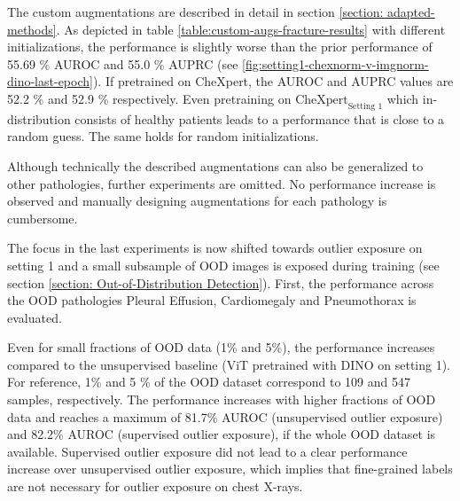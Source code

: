 The custom augmentations are described in detail in section \ref{section: adapted-methods}.
As depicted in table \ref{table:custom-augs-fracture-results} with different initializations, the performance is slightly worse than the prior performance of 55.69 \% AUROC  and 55.0 \% AUPRC (see \ref{fig:setting1-chexnorm-v-imgnorm-dino-last-epoch}).
If pretrained on CheXpert, the AUROC and AUPRC values are 52.2 \% and 52.9 \% respectively. 
Even pretraining on $\text{CheXpert}_\text{Setting 1}$ which in-distribution consists of healthy patients leads to a performance that is close to a random guess.
The same holds for random initializations.
\par
Although technically the described augmentations can also be generalized to other pathologies, further experiments are omitted.
No performance increase is observed and manually designing augmentations for each pathology is cumbersome.
\par
The focus in the last experiments is now shifted towards outlier exposure on setting 1 and a small subsample of OOD images is exposed during training (see section \ref{section: Out-of-Distribution Detection}).
First, the performance across the OOD pathologies Pleural Effusion, Cardiomegaly and Pneumothorax is evaluated.
\par
Even for small fractions of OOD data (1\% and 5\%), the performance increases compared to the unsupervised baseline (ViT pretrained with DINO on setting 1).
For reference, 1\% and 5 \% of the OOD dataset correspond to 109 and 547 samples, respectively.
The performance increases with higher fractions of OOD data and reaches a maximum of 81.7\% AUROC (unsupervised outlier exposure) and 82.2\% AUROC (supervised outlier exposure), if the whole OOD dataset is available.
Supervised outlier exposure did not lead to a clear performance increase over unsupervised outlier exposure, which implies that fine-grained labels are not necessary for outlier exposure on chest X-rays.
